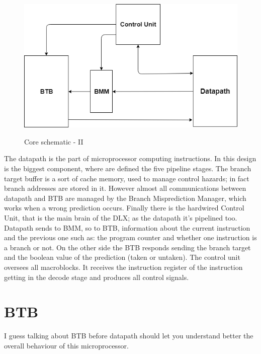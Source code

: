 \begin{figure}[H]
\centering
\includegraphics[scale=.6]{Immagini/07}
\label{02}
\caption{Core schematic - II}
\end{figure}
The datapath is the part of microprocessor computing instructions. In this design is the biggest component, where are defined the five pipeline stages. The branch target buffer is a sort of cache memory, used to manage control hazards; in fact branch addresses are stored in it. However almost all communications between datapath and BTB are managed by the Branch Misprediction Manager, which works when a wrong prediction occurs. Finally there is the hardwired Control Unit, that is the main brain of the DLX; as the datapath it's pipelined too.\newline
Datapath sends to BMM, so to BTB, information about the current instruction and the previous one such as: the program counter and whether one instruction is a branch or not. On the other side the BTB responds sending the branch target and the boolean value of the prediction (taken or untaken). The control unit oversees all macroblocks. It receives the instruction register of the instruction getting in the decode stage and produces all control signals.

\section{BTB}

I guess talking about BTB before datapath should let you understand better the overall behaviour of this microprocessor.